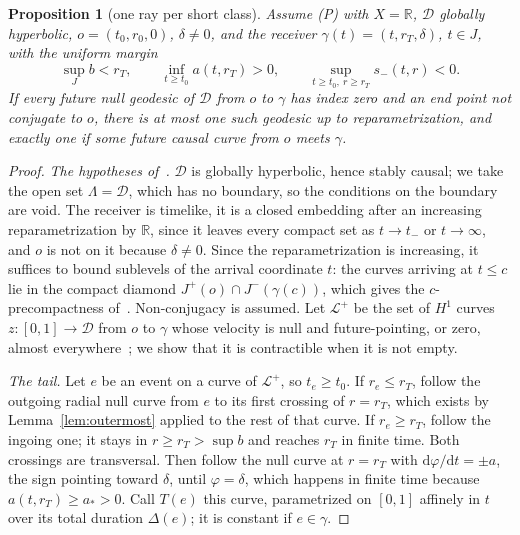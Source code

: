 \documentclass[aip,jmp,amsmath,amssymb,reprint]{revtex4-2}
\newcommand{\dd}{\mathrm{d}}
\theoremstyle{plain}
\newtheorem{proposition}{Proposition}[section]
\theoremstyle{definition}
\begin{document}
\begin{proposition}[one ray per short class]\label{prop:count}
Assume (P) with $X=\mathbb R$, $\mathcal D$ globally hyperbolic, $o=(t_0,r_0,0)$, $\delta\ne0$, and the
receiver $\gamma(t)=(t,r_T,\delta)$, $t\in J$, with the uniform margin
\[
  \sup_Jb<r_T,\qquad \inf_{t\ge t_0}a(t,r_T)>0,\qquad \sup_{t\ge t_0,\ r\ge r_T}s_-(t,r)<0 .
\]
If every future null geodesic of $\mathcal D$ from $o$ to $\gamma$ has index zero and an end point not
conjugate to $o$, there is at most one such geodesic up to reparametrization, and exactly one if
some future causal curve from $o$ meets $\gamma$.
\end{proposition}

\begin{proof}
\emph{The hypotheses of~\cite[Theorem~1.7]{GiannoniMasielloPiccioneMorse}.} $\mathcal D$ is globally
hyperbolic, hence stably causal; we take the open set $\Lambda=\mathcal D$, which has no boundary, so
the conditions on the boundary are void. The receiver is timelike, it is a closed embedding
after an increasing reparametrization by $\mathbb R$, since it leaves every compact set as $t\to t_-$
or $t\to\infty$, and $o$ is not on it because $\delta\ne0$. Since the reparametrization is increasing, it
suffices to bound sublevels of the arrival coordinate $t$: the curves arriving at $t\le c$ lie in the
compact diamond $J^+(o)\cap J^-(\gamma(c))$, which gives the $c$-precompactness
of~\cite[Definition~1.2]{GiannoniMasielloPiccioneMorse}. Non-conjugacy is assumed. Let $\mathcal L^+$ be the set of
$H^1$ curves $z:[0,1]\to\mathcal D$ from $o$ to $\gamma$ whose velocity is null and future-pointing, or
zero, almost everywhere~\cite[(1.4)]{GiannoniMasielloPiccioneMorse}; we show that it is
contractible when it is not empty.

\emph{The tail.} Let $e$ be an event on a curve of $\mathcal L^+$, so $t_e\ge t_0$. If $r_e\le r_T$, follow
the outgoing radial null curve from $e$ to its first crossing of $r=r_T$, which exists by
Lemma~\ref{lem:outermost} applied to the rest of that curve. If $r_e\ge r_T$, follow the ingoing
one; it stays in $r\ge r_T>\sup b$ and reaches $r_T$ in finite time. Both crossings are
transversal. Then follow the null curve at $r=r_T$ with $\dd\varphi/\dd t=\pm a$, the sign
pointing toward $\delta$, until $\varphi=\delta$, which happens in finite time because
$a(t,r_T)\ge a_*>0$. Call $T(e)$ this curve, parametrized on $[0,1]$ affinely in $t$ over its total
duration $\Delta(e)$; it is constant if $e\in\gamma$.


\end{proof}
\end{document}
